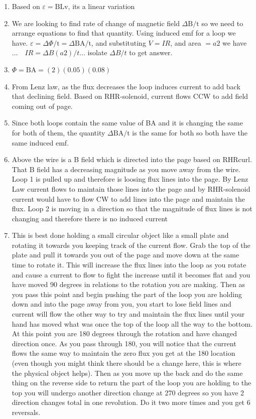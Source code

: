 \begin{enumerate}
\begin{enumerate}
  \item Based on $\varepsilon=\mathrm{BLv}$, its a linear variation
  \item We are looking to find rate of change of magnetic field $\Delta \mathrm{B} / \mathrm{t}$ so we need to arrange equations to find that quantity. Using induced emf for a loop we have. $\varepsilon=\Delta \Phi / \mathrm{t}=\Delta \mathrm{BA} / \mathrm{t}$, and substituting $V=I R$, and area $=a 2$ we have $\ldots \quad I R=\Delta B(a 2) / t \ldots$ isolate $\Delta B / t$ to get answer.
  \item $\Phi=\mathrm{BA}=(2)(0.05)(0.08)$
  \item From Lenz law, as the flux decreases the loop induces current to add back that declining field. Based on RHR-solenoid, current flows CCW to add field coming out of page.
  \item Since both loops contain the same value of BA and it is changing the same for both of them, the quantity $\Delta \mathrm{BA} / \mathrm{t}$ is the same for both so both have the same induced emf.
  \item Above the wire is a B field which is directed into the page based on RHRcurl. That B field has a decreasing magnitude as you move away from the wire. Loop 1 is pulled up and therefore is loosing flux lines into the page. By Lenz Law current flows to maintain those lines into the page and by RHR-solenoid current would have to flow CW to add lines into the page and maintain the flux. Loop 2 is moving in a direction so that the magnitude of flux lines is not changing and therefore there is no induced current
  \item This is best done holding a small circular object like a small plate and rotating it towards you keeping track of the current flow. Grab the top of the plate and pull it towards you out of the page and move down at the same time to rotate it. This will increase the flux lines into the loop as you rotate and cause a current to flow to fight the increase until it becomes flat and you have moved 90 degrees in relations to the rotation you are making. Then as you pass this point and begin pushing the part of the loop you are holding down and into the page away from you, you start to lose field lines and current will flow the other way to try and maintain the flux lines until your hand has moved what was once the top of the loop all the way to the bottom. At this point you are 180 degrees through the rotation and have changed direction once. As you pass through 180, you will notice that the current flows the same way to maintain the zero flux you get at the 180 location (even though you might think there should be a change here, this is where the physical object helps). Then as you move up the back and do the same thing on the reverse side to return the part of the loop you are holding to the top you will undergo another direction change at 270 degrees so you have 2 direction changes total in one revolution. Do it two more times and you get 6 reversals.

\end{enumerate}
\end{enumerate}
